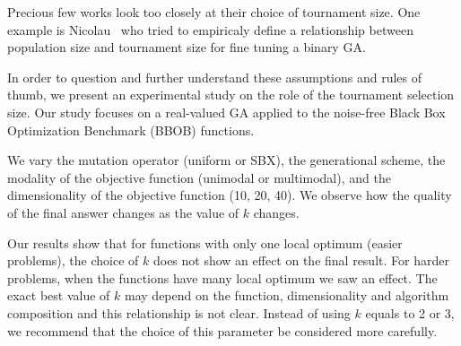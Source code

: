 
Precious few works look too closely at their choice of tournament
size. One example is Nicolau~\cite{nicolau2009application} who tried
to empiricaly define a relationship between population size and
tournament size for fine tuning a binary GA.

In order to question and further understand these assumptions and
rules of thumb, we present an experimental study on the role of the
tournament selection size. Our study focuses on a real-valued GA
applied to the noise-free Black Box Optimization Benchmark (BBOB)
functions.

We vary the mutation operator (uniform or SBX), the generational
scheme, the modality of the objective function (unimodal or
multimodal), and the dimensionality of the objective function (10, 20,
40).  We observe how the quality of the final answer changes as the
value of $k$ changes.

Our results show that for functions with only one local optimum
(easier problems), the choice of $k$ does not show an effect on the
final result. For harder problems, when the functions have many local
optimum we saw an effect. The exact best value of $k$ may depend on
the function, dimensionality and algorithm composition and this
relationship is not clear. Instead of using $k$ equals to 2 or 3, we
recommend that the choice of this parameter be considered more
carefully.
